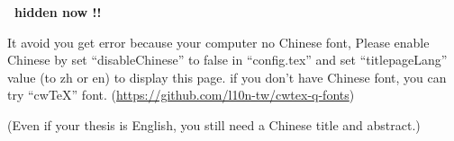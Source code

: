 \documentclass[class=NCU_thesis, crop=false]{standalone}
\begin{document}
\fontsize{16}{25}\selectfont
\sffamily %
\begin{titlepage}
    \vspace*{30mm}
    \begin{center}
        {\Huge\textbf{\thispage\ hidden now !!}\par}
    \end{center}
    \vspace*{30mm}
    {\Huge 
    It avoid you get error because your computer no Chinese font, 
    Please enable Chinese by set ``disableChinese'' to false in ``config.tex'' and  set ``titlepageLang'' value (to zh or en) to display this page.
    if you don't have Chinese font, you can try ``cwTeX'' font. 
    (\url{https://github.com/l10n-tw/cwtex-q-fonts})\par
    (Even if your thesis is English, you still need a Chinese title and abstract.)\par}
    \null\vfill
\end{titlepage}
\restoregeometry
\rmfamily %
\cleardoublepage
\end{document}

